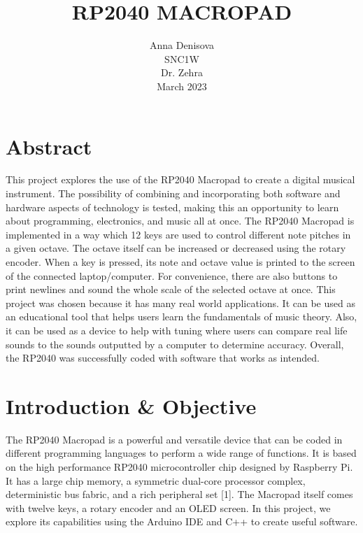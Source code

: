 \documentclass{article}
\begin{document}
\title{RP2040 MACROPAD}
\author{Anna Denisova\\SNC1W\\Dr. Zehra\\March 2023}
\date{}

\maketitle

\tableofcontents

\newpage

\section{Abstract}

\hspace{1cm} This project explores the use of the RP2040 Macropad to create a digital musical instrument. The possibility of combining and incorporating both software and hardware aspects of technology is tested, making this an opportunity to learn about programming, electronics, and music all at once. The RP2040 Macropad is implemented in a way which 12 keys are used to control different note pitches in a given octave. The octave itself can be increased or decreased using the rotary encoder. When a key is pressed, its note and octave value is printed to the screen of the connected laptop/computer. For convenience, there are also buttons to print newlines and sound the whole scale of the selected octave at once. This project was chosen because it has many real world applications. It can be used as an educational tool that helps users learn the fundamentals of music theory. Also, it can be used as a device to help with tuning where users can compare real life sounds to the sounds outputted by a computer to determine accuracy. Overall, the RP2040 was successfully coded with software that works as intended.

\section{Introduction \& Objective}

\hspace{1cm} The RP2040 Macropad is a powerful and versatile device that can be coded in different programming languages to perform a wide range of functions. It is based on the high performance RP2040 microcontroller chip designed by Raspberry Pi. It has a large chip memory, a symmetric dual-core processor complex, deterministic bus fabric, and a rich peripheral set [1]. The Macropad itself comes with twelve keys, a rotary encoder and an OLED screen. In this project, we explore its capabilities using the Arduino IDE and C++ to create useful software. 
\end{document}
